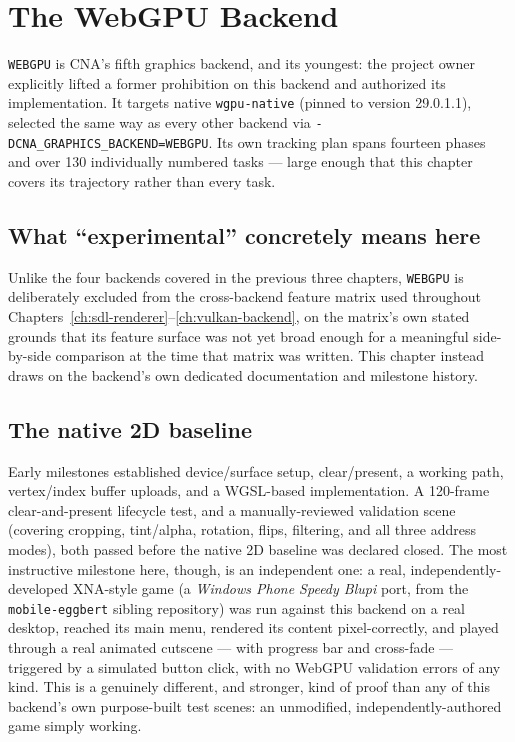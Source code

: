 \chapter{The WebGPU Backend}
\label{ch:webgpu-backend}

\texttt{WEBGPU} is CNA's fifth graphics backend, and its youngest: the project owner
explicitly lifted a former prohibition on this backend and authorized its implementation.
It targets native \texttt{wgpu-native} (pinned to version 29.0.1.1), selected the same way
as every other backend via \texttt{-DCNA\_GRAPHICS\_BACKEND=WEBGPU}. Its own tracking plan
spans fourteen phases and over 130 individually numbered tasks --- large enough that this
chapter covers its trajectory rather than every task.

\section{What ``experimental'' concretely means here}

Unlike the four backends covered in the previous three chapters, \texttt{WEBGPU} is
deliberately excluded from the cross-backend feature matrix used throughout
Chapters~\ref{ch:sdl-renderer}--\ref{ch:vulkan-backend}, on the matrix's own stated grounds
that its feature surface was not yet broad enough for a meaningful side-by-side comparison at
the time that matrix was written. This chapter instead draws on the backend's own dedicated
documentation and milestone history.

\section{The native 2D baseline}

Early milestones established device/surface setup, clear/present, a working
 path, vertex/index buffer uploads, and a WGSL-based
 implementation. A 120-frame clear-and-present lifecycle test, and a
manually-reviewed  validation scene (covering cropping, tint/alpha,
rotation, flips, filtering, and all three address modes), both passed before the native 2D
baseline was declared closed. The most instructive milestone here, though, is an independent
one: a real, independently-developed XNA-style game (a \emph{Windows Phone Speedy Blupi}
port, from the \texttt{mobile-eggbert} sibling repository) was run against this backend on a
real desktop, reached its main menu, rendered its  content
pixel-correctly, and played through a real animated cutscene --- with progress bar and
cross-fade --- triggered by a simulated button click, with no WebGPU validation errors of any
kind. This is a genuinely different, and stronger, kind of proof than any of this backend's
own purpose-built test scenes: an unmodified, independently-authored game simply working.

